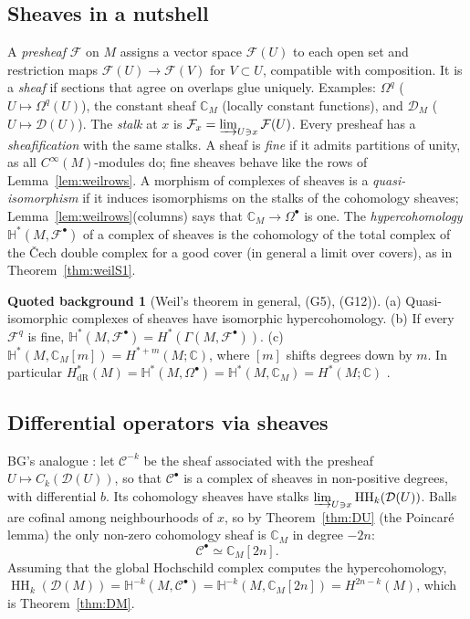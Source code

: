 \documentclass[11pt,oneside,reqno]{article}
\DeclareMathOperator{\HH}{HH}
\newcommand{\C}{\mathbb C}
\newcommand{\cD}{\mathcal D}
\newcommand{\CI}{C^\infty}
\newcommand{\Om}{\Omega}
\theoremstyle{plain}
\theoremstyle{definition}
\newtheorem{background}[theorem]{Quoted background}
\theoremstyle{remark}
\begin{document}
\subsection{Sheaves in a nutshell}\label{subsec:sheaves}
A \emph{presheaf} \(\mathcal F\) on \(M\) assigns a vector space \(\mathcal F(U)\) to each open set and
restriction maps \(\mathcal F(U)\to\mathcal F(V)\) for \(V\subset U\), compatible with composition. It is a
\emph{sheaf} if sections that agree on overlaps glue uniquely. Examples: \(\Om^q\)
(\(U\mapsto\Om^q(U)\)), the constant sheaf \(\C_M\) (locally constant functions), and
\(\cD_M\) (\(U\mapsto\cD(U)\)). The \emph{stalk} at \(x\) is \(\mathcal F_x=\varinjlim_{U\ni x}\mathcal F(U)\). Every
presheaf has a \emph{sheafification} with the same stalks. A sheaf is \emph{fine} if it
admits partitions of unity, as all \(\CI(M)\)-modules do; fine sheaves behave like the
rows of Lemma~\ref{lem:weilrows}. A morphism of complexes of sheaves is a
\emph{quasi-isomorphism} if it induces isomorphisms on the stalks of the cohomology
sheaves; Lemma~\ref{lem:weilrows}(columns) says that \(\C_M\to\Om^\bullet\) is one. The
\emph{hypercohomology} \(\mathbb H^*(M,\mathcal F^\bullet)\) of a complex of sheaves is the cohomology of the
total complex of the Čech double complex for a good cover (in general a limit over
covers), as in Theorem~\ref{thm:weilS1}.

\begin{background}[Weil's theorem in general, (G5), (G12)]\label{bg:weil}
(a) Quasi-isomorphic complexes of sheaves have isomorphic hypercohomology.
(b) If every \(\mathcal F^q\) is fine, \(\mathbb H^*(M,\mathcal F^\bullet)=H^*(\Gamma(M,\mathcal F^\bullet))\).
(c) \(\mathbb H^*(M,\C_M[m])=H^{*+m}(M;\C)\), where \([m]\) shifts degrees down by \(m\).
In particular \(H^*_{\mathrm{dR}}(M)=\mathbb H^*(M,\Om^\bullet)=\mathbb H^*(M,\C_M)=H^*(M;\C)\) \cite{BottTu,Weil}.
\end{background}

\subsection{Differential operators via sheaves}\label{subsec:Dsheaf}
BG's analogue \cite[\S5]{BG}: let \(\mathcal C^{-k}\) be the sheaf associated with the presheaf
\(U\mapsto C_k(\cD(U))\), so that \(\mathcal C^\bullet\) is a complex of sheaves in non-positive degrees, with
differential \(b\). Its cohomology sheaves have stalks
\(\varinjlim_{U\ni x}\HH_k(\cD(U))\). Balls are cofinal among neighbourhoods of \(x\), so by
Theorem~\ref{thm:DU} (the Poincaré lemma) the only non-zero cohomology sheaf is
\(\C_M\) in degree \(-2n\):
\[
 \mathcal C^\bullet\simeq\C_M[2n].
\]
Assuming that the global Hochschild complex computes the hypercohomology,
\(\HH_k(\cD(M))=\mathbb H^{-k}(M,\mathcal C^\bullet)=\mathbb H^{-k}(M,\C_M[2n])=H^{2n-k}(M)\), which is
Theorem~\ref{thm:DM}.
\end{document}
